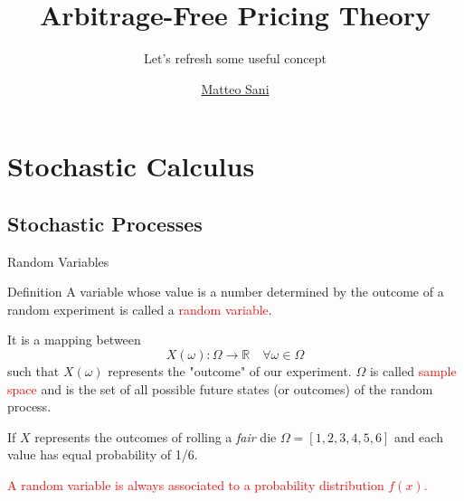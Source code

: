 \documentclass{beamer}
\title{Arbitrage-Free Pricing Theory}
\subtitle{Let's refresh some useful concept}
\author{\href{mailto:matteo.sani@unisi.it}{Matteo Sani}}
\begin{document}
	\begin{frame}[plain]
		\maketitle
	\end{frame}        



\section{Stochastic Calculus}
\subsection{Stochastic Processes}
\begin{frame}{Random Variables}
	\begin{block}{Definition}
	A variable whose value is a number determined by the outcome of a random experiment is called a \textcolor{red}{random variable}.
	
	It is a mapping between 
	\begin{equation*}
		X(\omega):\Omega\rightarrow \mathbb{R}\quad \forall\omega\in\Omega
	\end{equation*}
	such that $X(\omega)$ represents the "outcome" of our experiment. $\Omega$ is called \textcolor{red}{sample space} and is the set of all possible future states (or outcomes) of the random process.
	\end{block}
        
	If $X$ represents the outcomes of rolling a \emph{fair} die $\Omega = [1,2,3,4,5,6]$ and each value has equal probability of 1/6.
	\vspace{0.5cm}
        
	\textcolor{red}{A random variable is always associated to a probability distribution $f(x)$.}
\end{frame}
\end{document}
